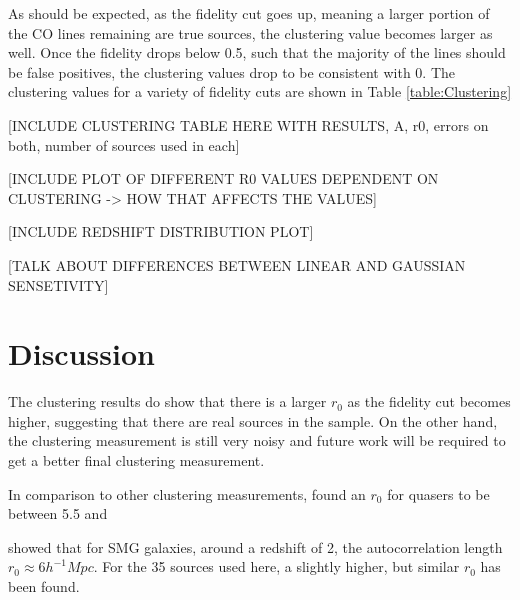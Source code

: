 As should be expected, as the fidelity cut goes up, meaning a larger portion of the CO lines remaining are true sources, the clustering value becomes larger as well. Once the fidelity drops below 0.5, such that the majority of the lines should be false positives, the clustering values drop to be consistent with 0. The clustering values for a variety of fidelity cuts are shown in Table \ref{table:Clustering}

[INCLUDE CLUSTERING TABLE HERE WITH RESULTS, A, r0, errors on both, number of sources used in each] \label{table:Clustering}

[INCLUDE PLOT OF DIFFERENT R0 VALUES DEPENDENT ON CLUSTERING -> HOW THAT AFFECTS THE VALUES]

[INCLUDE REDSHIFT DISTRIBUTION PLOT]

[TALK ABOUT DIFFERENCES BETWEEN LINEAR AND GAUSSIAN SENSETIVITY]

\section{Discussion}

The clustering results do show that there is a larger $r_0$ as the fidelity cut becomes higher, suggesting that there are real sources in the sample. On the other hand, the clustering measurement is still very noisy and future work will be required to get a better final clustering measurement. 

In comparison to other clustering measurements, \cite{hickox2011clustering} found an $r_0$ for quasers to be between 5.5 and 

\cite{hickox2011clustering} showed that for SMG galaxies, around a redshift of 2, the autocorrelation length $r_0 \approx 6 h^{-1} Mpc$. For the 35 sources used here, a slightly higher, but similar $r_0$ has been found. 

